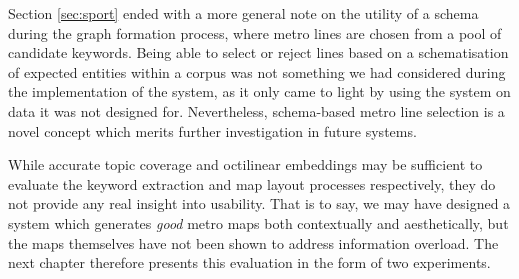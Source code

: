 Section \ref{sec:sport} ended with a more general note on the utility of a schema during the graph formation process, where metro lines are chosen from a pool of candidate keywords. Being able to select or reject lines based on a schematisation of expected entities within a corpus was not something we had considered during the implementation of the system, as it only came to light by using the system on data it was not designed for. Nevertheless, schema-based metro line selection is a novel concept which merits further investigation in future systems.

While accurate topic coverage and octilinear embeddings may be sufficient to evaluate the keyword extraction and map layout processes respectively, they do not provide any real insight into usability. That is to say, we may have designed a system which generates \textit{good} metro maps both contextually and aesthetically, but the maps themselves have not been shown to address information overload. The next chapter therefore presents this evaluation in the form of two experiments.


